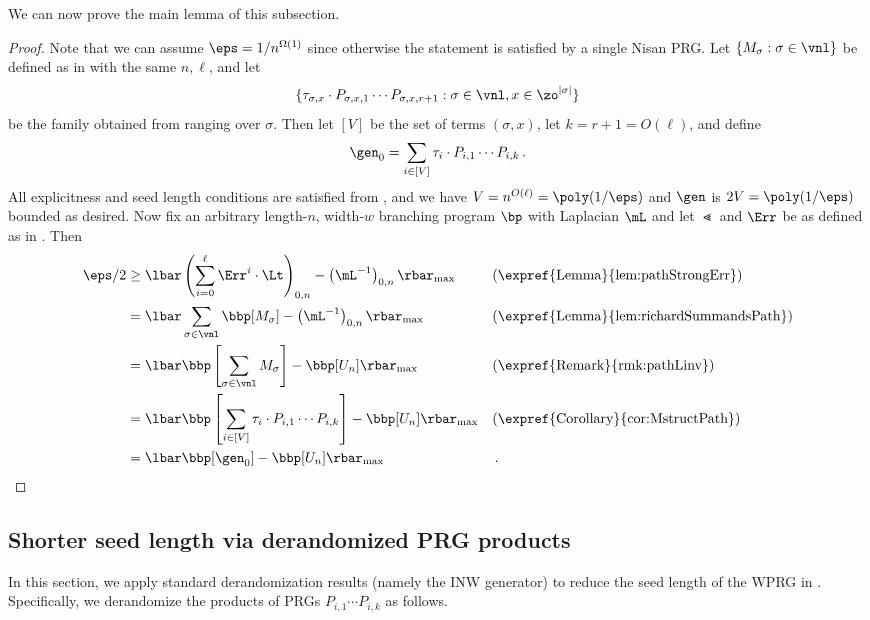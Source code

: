 We can now prove the main lemma of this subsection.
\pathRichardson*
\begin{proof}
Note that we can assume $\eps=1/n^{\Omega(1)}$ since otherwise the statement is satisfied by a single Nisan PRG. Let $\{M_\sigma:\sigma \in \vnl\}$ be defined as in  with the same $n,\ell$, and let 
$$\{\tau_{\sigma,x}\cdot P_{\sigma,x,1}\cdots P_{\sigma,x,r+1}:\sigma\in \vnl,x\in \zo^{|\sigma|}\}$$ 
be the family obtained from  ranging over $\sigma$. Then let $[V]$ be the set of terms $(\sigma,x)$, let $k=r+1=O(\ell)$, and define
\[\gen_0=\sum_{i\in[V]}\tau_{i}\cdot P_{i,1}\cdots P_{i,k}\,.\]
All explicitness and seed length conditions are satisfied from , and we have $V=n^{O(\ell)} =\poly(1/\eps)$ and $\gen$ is $2V=\poly(1/\eps)$ bounded as desired.
Now fix an arbitrary length-$n$, width-$w$ branching program $\bp$ with Laplacian $\mL$ and let $\Lt$ and $\Err$ be as defined as in . Then
\begin{align*}
    \eps/2 &\geq \lbar \left(\sum_{i=0}^\ell \Err^i\cdot \Lt\right)_{0,n}-\left(\mL^{-1}\right)_{0,n}\rbar_{\max} && \text{(\expref{Lemma}{lem:pathStrongErr})}\\ 
    &= \lbar\sum_{\sigma \in \vnl}\bbp[M_\sigma]-\left(\mL^{-1}\right)_{0,n}\rbar_{\max} && \text{(\expref{Lemma}{lem:richardSummandsPath})}\\
    &= \lbar\bbp\left[\sum_{\sigma \in \vnl}M_\sigma\right]-\bbp[U_n]\rbar_{\max} && \text{(\expref{Remark}{rmk:pathLinv})}\\
    &= \lbar\bbp\left[\sum_{i \in [V]}\tau_{i}\cdot P_{i,1}\cdots P_{i,k}\right]-\bbp[U_n]\rbar_{\max} && \text{(\expref{Corollary}{cor:MstructPath})}\\
    &= \lbar \bbp[\gen_0] - \bbp[U_n]\rbar_{\max} && \,. \qedhere
\end{align*}
\end{proof}

\subsection{Shorter seed length via derandomized PRG products}
In this section, we apply standard derandomization results (namely the INW generator) to reduce the seed length of the WPRG in . Specifically, we derandomize the products of PRGs $P_{i,1}\cdots P_{i,k}$ as follows. %

